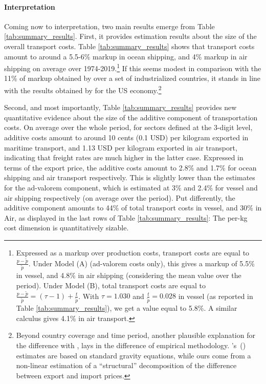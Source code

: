 \documentclass[a4paper,11pt]{article}
\newcommand\cites[1]{\citeauthor{#1}'s\ (\citeyear{#1})}
\begin{document}



\paragraph{Interpretation} Coming now to interpretation, two main results emerge from Table \ref{tab:summary_results}.
First, it provides estimation results about the size of the overall transport costs.
Table \ref{tab:summary_results} shows that transport costs amount to around a 5.5-6\% markup in ocean shipping, and 4\% markup in air shipping on average over 1974-2019.\footnote{Expressed as a markup over production costs, transport costs are equal to $\frac{p-\widetilde{p}}{\widetilde{p}}$.
Under Model (A) (ad-valorem costs only), this gives a markup of 5.5\% in vessel, and 4.8\% in air shipping (considering the mean value over the period).
Under Model (B), total transport costs are equal to $\frac{p-\widetilde{p}}{\widetilde{p}} = (\tau-1) + \frac{t}{\widetilde{p}}$.
With $\tau= 1.030$ and $\frac{t}{\widetilde{p}}= 0.028$ in vessel (as reported in Table \ref{tab:summary_results}), we get a value equal to 5.8\%.
A similar calculus gives 4.1\% in air transport.} If this seems modest in comparison with the 11\% of markup obtained by \cite{anderson_wincoop_jel} over a set of industrialized countries, it stands in line with the results obtained by \cite{hummels2007} for the US economy.\footnote{Beyond country coverage and time period, another plausible explanation for the difference with \cite{anderson_wincoop_jel}, lays in the difference of empirical methodology.
\cites{anderson_wincoop_jel} estimates are based on standard gravity equations, while ours come from a non-linear estimation of a ``structural'' decomposition of the difference between export and import prices.}

Second, and most importantly, Table \ref{tab:summary_results} provides new quantitative evidence about the size of the additive component of transportation costs.
On average over the whole period, for sectors defined at the 3-digit level, additive costs amount to around 10 cents (0.1 USD) per kilogram exported in maritime transport, and 1.13 USD per kilogram exported in air transport, indicating that freight rates are much higher in the latter case.
Expressed in terms of the export price, the additive costs amount to 2.8\% and 1.7\% for ocean shipping and air transport respectively.
This is slightly lower than the estimates for the ad-valorem component, which is estimated at 3\% and 2.4\% for vessel and air shipping respectively (on average over the period).
Put differently, the additive component amounts to 44\% of total transport costs in vessel, and 30\% in Air, as displayed in the last rows of Table \ref{tab:summary_results}: The per-kg cost dimension is quantitatively sizable.
\medskip
\end{document}
